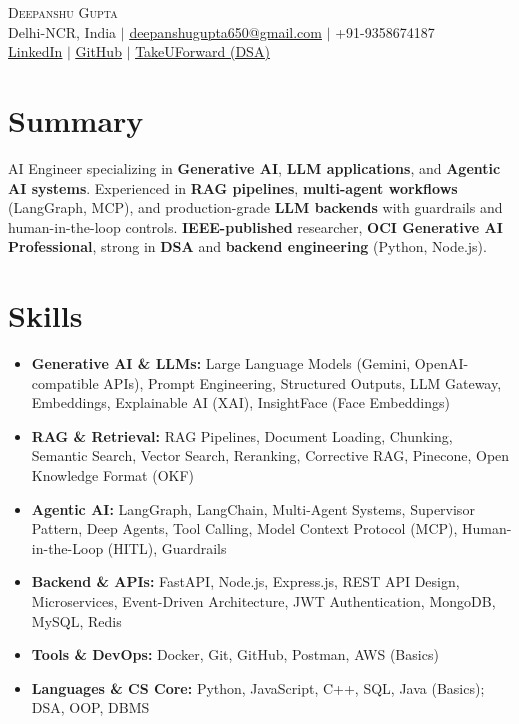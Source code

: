 \documentclass[a4paper,10pt]{article}
\begin{document}
\begin{center}
    {\Huge \scshape Deepanshu Gupta} \\ \vspace{3pt}
    \small
    Delhi-NCR, India $|$
    \href{mailto:deepanshugupta650@gmail.com}{\underline{deepanshugupta650@gmail.com}} $|$
    +91-9358674187 \\ \vspace{2pt}
    \href{https://linkedin.com/in/deepanshugupta650}{\underline{LinkedIn}} $|$
    \href{https://github.com/deepanshuguptacode}{\underline{GitHub}} $|$
    \href{https://takeuforward.org/profile/deepanshuguptacode/}{\underline{TakeUForward (DSA)}}
\end{center}

\vspace{-4pt}

\section{Summary}
\small{
AI Engineer specializing in \textbf{Generative AI}, \textbf{LLM applications}, and \textbf{Agentic AI systems}. Experienced in \textbf{RAG pipelines}, \textbf{\mbox{multi-agent} workflows} (LangGraph, MCP), and production-grade \textbf{LLM backends} with guardrails and human-in-the-loop controls. \textbf{IEEE-published} researcher, \textbf{OCI Generative AI Professional}, strong in \textbf{DSA} and \textbf{backend engineering} (Python, Node.js).
}

\section{Skills}
\begin{itemize}[leftmargin=0.15in, label={}, itemsep=1pt]
  \small
  \item \textbf{Generative AI \& LLMs:} Large Language Models (Gemini, OpenAI-compatible APIs), Prompt Engineering, Structured Outputs, LLM Gateway, Embeddings, Explainable AI (XAI), InsightFace (Face Embeddings)
  \item \textbf{RAG \& Retrieval:} RAG Pipelines, Document Loading, Chunking, Semantic Search, Vector Search, Reranking, Corrective RAG, Pinecone, Open Knowledge Format (OKF)
  \item \textbf{Agentic AI:} LangGraph, LangChain, \mbox{Multi-Agent} Systems, Supervisor Pattern, Deep Agents, Tool Calling, Model Context Protocol (MCP), \mbox{Human-in-the-Loop} (HITL), Guardrails
  \item \textbf{Backend \& APIs:} FastAPI, Node.js, Express.js, REST API Design, Microservices, \mbox{Event-Driven} Architecture, JWT Authentication, MongoDB, MySQL, Redis
  \item \textbf{Tools \& DevOps:} Docker, Git, GitHub, Postman, AWS (Basics)
  \item \textbf{Languages \& CS Core:} Python, JavaScript, C++, SQL, Java (Basics); DSA, OOP, DBMS
\end{itemize}
\end{document}
